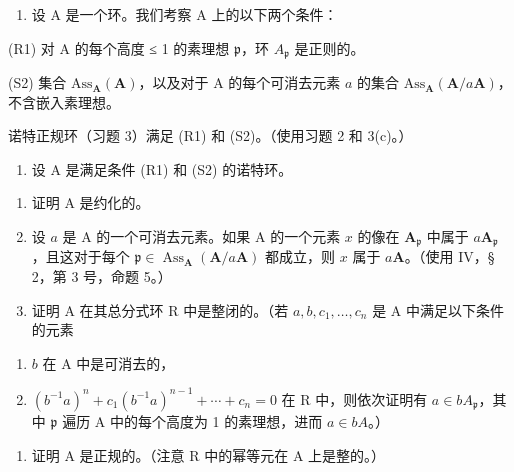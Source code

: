 \begin{enumerate}
\def\labelenumi{\arabic{enumi})}
\setcounter{enumi}{3}
\tightlist
\item
  设 A 是一个环。我们考察 A 上的以下两个条件：
\end{enumerate}

(R1) 对 A 的每个高度 ≤ 1 的素理想 \(\mathfrak{p}\)，环 \(A_{\mathfrak{p}}\) 是正则的。

(S2) 集合 \(\mathrm{Ass}_{\mathbf{A}}(\mathbf{A})\)，以及对于 A 的每个可消去元素 \(a\) 的集合 \(\mathrm{Ass}_{\mathbf{A}}(\mathbf{A}/a\mathbf{A})\)，不含嵌入素理想。

  诺特正规环（习题 3）满足 (R1) 和 (S2)。（使用习题 2 和 3(c)。）

\begin{enumerate}
\def\labelenumi{\arabic{enumi})}
\setcounter{enumi}{4}
\tightlist
\item
  设 A 是满足条件 (R1) 和 (S2) 的诺特环。
\end{enumerate}

\begin{enumerate}
\def\labelenumi{\alph{enumi})}
\item
  证明 A 是约化的。
\item
  设 \(a\) 是 A 的一个可消去元素。如果 A 的一个元素 \(x\) 的像在 \(\mathbf{A}_{\mathfrak{p}}\) 中属于 \(a\mathbf{A}_{\mathfrak{p}}\)，且这对于每个 \(\mathfrak{p} \in \operatorname{Ass}_{\mathbf{A}}(\mathbf{A}/a\mathbf{A})\) 都成立，则 \(x\) 属于 \(a\mathbf{A}\)。（使用 IV，§ 2，第 3 号，命题 5。）
\item
  证明 A 在其总分式环 R 中是整闭的。（若 \(a, b, c_{1}, \ldots, c_{n}\) 是 A 中满足以下条件的元素
\end{enumerate}

\begin{enumerate}
\def\labelenumi{(\roman{enumi})}
\item
  \(b\) 在 A 中是可消去的，
\item
  \((b^{-1}a)^{n} + c_{1}(b^{-1}a)^{n-1} + \cdots + c_{n} = 0\) 在 R 中，则依次证明有 \(a \in bA_{\mathfrak{p}}\)，其中 \(\mathfrak{p}\) 遍历 A 中的每个高度为 1 的素理想，进而 \(a \in bA\)。）
\end{enumerate}

\begin{enumerate}
\def\labelenumi{\alph{enumi})}
\setcounter{enumi}{3}
\tightlist
\item
  证明 A 是正规的。（注意 R 中的幂等元在 A 上是整的。）
\end{enumerate}

